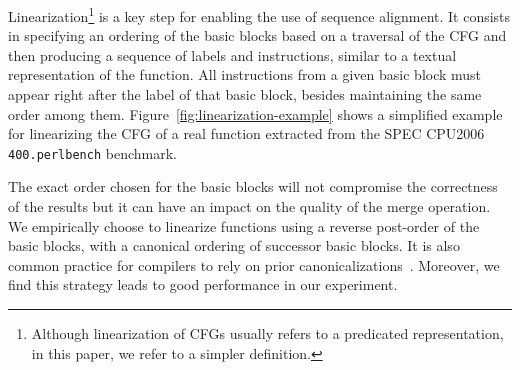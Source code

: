 Linearization\footnote{Although linearization of CFGs
usually refers to a predicated representation, %
in this paper, we refer to a simpler definition.} is a key step for enabling the use of sequence alignment. It consists in specifying an
ordering of the basic blocks based on a traversal of the CFG and then producing a sequence of labels and instructions, similar to a textual
representation of the function. All instructions from a given basic block must appear right after the label of that basic block, besides
maintaining the same order among them. Figure~\ref{fig:linearization-example} shows a simplified example for linearizing the CFG of a
real function extracted from the SPEC CPU2006 \texttt{400.perlbench} benchmark.



The exact order chosen for the basic blocks will not compromise the correctness of the results but it can have an impact on the quality of
the merge operation. We empirically choose to linearize functions using a reverse post-order of the basic blocks, with a canonical ordering of successor basic blocks.
It is also common practice for compilers to rely on prior canonicalizations~\cite{briggs94,liu96}.
Moreover, we find this strategy leads to good performance in our experiment.

